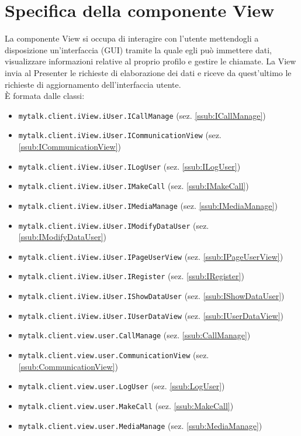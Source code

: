 \section{Specifica della componente View}\label{view.client} {

La componente View si occupa di interagire con l'utente mettendogli a disposizione un'interfaccia (GUI\g) tramite la quale egli può immettere dati, visualizzare informazioni relative al proprio profilo e gestire le chiamate. La View invia al Presenter le richieste di elaborazione dei dati e riceve da quest'ultimo le richieste di aggiornamento dell'interfaccia utente.\\
\`E formata dalle classi:
\begin{itemize}
	\item[] \texttt{mytalk.client.iView.iUser.ICallManage} (sez. \ref{ssub:ICallManage})
	\item[] \texttt{mytalk.client.iView.iUser.ICommunicationView} (sez. \ref{ssub:ICommunicationView})
	\item[] \texttt{mytalk.client.iView.iUser.ILogUser} (sez. \ref{ssub:ILogUser})
	\item[] \texttt{mytalk.client.iView.iUser.IMakeCall} (sez. \ref{ssub:IMakeCall})
	\item[] \texttt{mytalk.client.iView.iUser.IMediaManage} (sez. \ref{ssub:IMediaManage})
	\item[] \texttt{mytalk.client.iView.iUser.IModifyDataUser} (sez. \ref{ssub:IModifyDataUser})
	\item[] \texttt{mytalk.client.iView.iUser.IPageUserView} (sez. \ref{ssub:IPageUserView})
	\item[] \texttt{mytalk.client.iView.iUser.IRegister} (sez. \ref{ssub:IRegister})
	\item[] \texttt{mytalk.client.iView.iUser.IShowDataUser} (sez. \ref{ssub:IShowDataUser})
	\item[] \texttt{mytalk.client.iView.iUser.IUserDataView} (sez. \ref{ssub:IUserDataView})
	\item[] \texttt{mytalk.client.view.user.CallManage} (sez. \ref{ssub:CallManage})
	\item[] \texttt{mytalk.client.view.user.CommunicationView} (sez. \ref{ssub:CommunicationView})
	\item[] \texttt{mytalk.client.view.user.LogUser} (sez. \ref{ssub:LogUser})
	\item[] \texttt{mytalk.client.view.user.MakeCall} (sez. \ref{ssub:MakeCall})
	\item[] \texttt{mytalk.client.view.user.MediaManage} (sez. \ref{ssub:MediaManage})

\end{itemize}}

